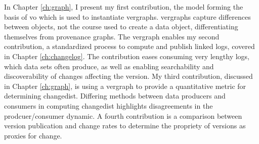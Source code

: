 In Chapter \ref{ch:graph}, I present my first contribution, the model forming the basis of \gls{vo} which is used to instantiate \glspl{vergraph}.
\Glspl{vergraph} capture differences between objects, not the course used to create a data object, differentiating themselves from provenance graphs.
The \gls{vergraph} enables my second contribution, a standardized process to compute and publish \gls{linked} \glspl{log}, covered in Chapter \ref{ch:changelog}.
The contribution eases consuming very lengthy logs, which data sets often produce, as well as enabling searchability and discoverability of \glspl{change} affecting the \gls{version}.
My third contribution, discussed in Chapter \ref{ch:graph}, is using a \gls{vergraph} to provide a quantitative metric for determining \gls{changedist}.
Differing methods between data producers and consumers in computing \gls{changedist} highlights disagreements in the prodcuer/consumer dynamic.
A fourth contribution is a comparison between version publication and change rates to determine the propriety of versions as proxies for change.

